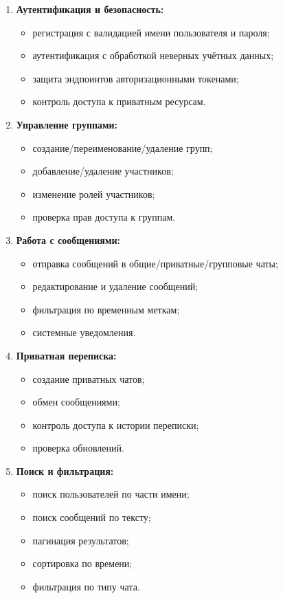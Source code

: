 \begin{enumerate}
	\item \textbf{Аутентификация и безопасность:}
	\begin{itemize}
		\item регистрация с валидацией имени пользователя и пароля;
		\item аутентификация с обработкой неверных учётных данных;
		\item защита эндпоинтов авторизационными токенами;
		\item контроль доступа к приватным ресурсам.
	\end{itemize}
	
	\item \textbf{Управление группами:}
	\begin{itemize}
		\item создание/переименование/удаление групп;
		\item добавление/удаление участников;
		\item изменение ролей участников;
		\item проверка прав доступа к группам.
	\end{itemize}
	
	\item \textbf{Работа с сообщениями:}
	\begin{itemize}
		\item отправка сообщений в общие/приватные/групповые чаты;
		\item редактирование и удаление сообщений;
		\item фильтрация по временным меткам;
		\item системные уведомления.
	\end{itemize}
	
	\item \textbf{Приватная переписка:}
	\begin{itemize}
		\item создание приватных чатов;
		\item обмен сообщениями;
		\item контроль доступа к истории переписки;
		\item проверка обновлений.
	\end{itemize}
	
	\item \textbf{Поиск и фильтрация:}
	\begin{itemize}
		\item поиск пользователей по части имени;
		\item поиск сообщений по тексту;
		\item пагинация результатов;
		\item сортировка по времени;
		\item фильтрация по типу чата.
	\end{itemize}
	

\end{enumerate}
